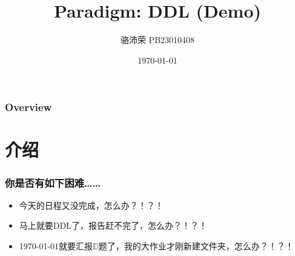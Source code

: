 \documentclass{beamer}
\title[Paradigm: DDL]{Paradigm: DDL (Demo)}
\author{骆沛荣 PB23010408} %
\institute[数批] %
{
	Assignment D, C Programming Class (H) \\ %
	\medskip
}
\date{\today} %
\begin{document}
	
	\begin{frame}
		\titlepage %
	\end{frame}
	
	\begin{frame}
		\frametitle{Overview} %
		\tableofcontents %
	\end{frame}
	
	
	\section{介绍} %
	
    \begin{frame}
    
        \sectionpage
    
    \end{frame}
	\begin{frame}
		\frametitle{你是否有如下困难……}
        \vfill
        \begin{itemize}[<+->]
            \item 今天的日程又没完成，怎么办？！？！\\\vfill
            \item 马上就要DDL了，报告赶不完了，怎么办？！？！\\\vfill
            \item \today 就要汇报$\mathbb D$题了，我的大作业才刚新建文件夹，怎么办？！？！\\
        \end{itemize}
        \vfill
	\end{frame}
	
	
\end{document}
